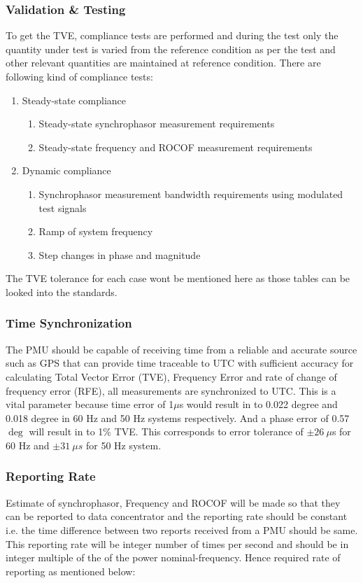\subsubsection{Validation \& Testing }

To get the TVE, compliance tests are performed and during the test only the quantity under test is varied from the reference condition as per the test and other relevant quantities are maintained at reference condition. There are following kind of compliance tests:
\begin{enumerate}
	\item Steady-state compliance
	\begin{enumerate}
		\item Steady-state synchrophasor measurement requirements
		\item Steady-state frequency and ROCOF measurement requirements
	\end{enumerate}
	\item Dynamic compliance
	\begin{enumerate}
		\item Synchrophasor measurement bandwidth requirements using modulated test signals
		\item Ramp of system frequency
		\item Step changes in phase and magnitude
	\end{enumerate}
\end{enumerate} 
The TVE tolerance for each case wont be mentioned here as those tables can be looked into the standards.


\subsubsection{Time Synchronization}

The PMU should be capable of receiving time from a reliable and accurate source such as GPS that can provide time traceable to UTC with sufficient accuracy for calculating Total Vector Error (TVE), Frequency Error and rate of change of frequency error (RFE), all measurements are synchronized to UTC.
This is a vital parameter because time error of 1$\mu$s would result in to 0.022 degree and 0.018 degree in 60 Hz and 50 Hz systems respectively. And a phase error of 0.57$\deg$ will result in to 1\% TVE. This corresponds to error tolerance of $\pm26 ~\mu$s for 60 Hz and $\pm 31 ~\mu s$ for 50 Hz system.

\subsubsection{Reporting Rate}
Estimate of synchrophasor, Frequency and ROCOF will be made so that they can be reported to data concentrator and the reporting rate should be constant i.e. the time difference between two reports received from a PMU should be same. This reporting rate will be integer number of times per second and should be in integer multiple of the of the power nominal-frequency. Hence required rate of reporting as mentioned below:

